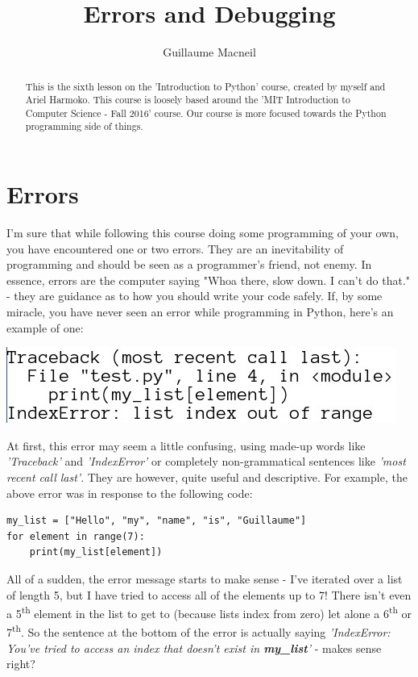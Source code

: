 \documentclass{article}
\title{Errors and Debugging}
\author{Guillaume Macneil}
\begin{document}
\maketitle

\begin{abstract}
This is the sixth lesson on the 'Introduction to Python' course, created by myself and Ariel Harmoko. This course is loosely based around the 'MIT Introduction to Computer Science - Fall 2016' course. Our course is more focused towards the Python programming side of things.
\end{abstract}

\section{Errors}
I'm sure that while following this course doing some programming of your own, you have encountered one or two errors. They are an inevitability of programming and should be seen as a programmer's friend, not enemy. In essence, errors are the computer saying "Whoa there, slow down. I can't do that." - they are guidance as to how you should write your code safely. If, by some miracle, you have never seen an error while programming in Python, here's an example of one: \medskip
\begin{center}
\includegraphics[scale=0.5]{example_error.jpg}
\end{center}
At first, this error may seem a little confusing, using made-up words like \textit{'Traceback'} and \textit{'IndexError'} or completely non-grammatical sentences like \textit{'most recent call last'}. They are however, quite useful and descriptive. For example, the above error was in response to the following code:
\begin{verbatim}
my_list = ["Hello", "my", "name", "is", "Guillaume"]
for element in range(7):
    print(my_list[element])
\end{verbatim}
All of a sudden, the error message starts to make sense - I've iterated over a list of length 5, but I have tried to access all of the elements up to 7! There isn't even a 5\textsuperscript{th} element in the list to get to (because lists index from zero) let alone a 6\textsuperscript{th} or 7\textsuperscript{th}. So the sentence at the bottom of the error is actually saying \textit{'IndexError: You've tried to access an index that doesn't exist in \textbf{my\_list}'} - makes sense right? \medskip
\end{document}
